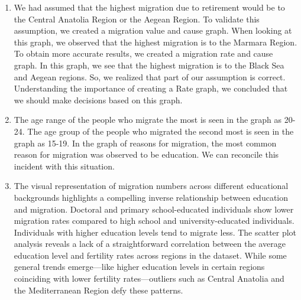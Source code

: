 \documentclass[
  11pt,
  a4paper,
  DIV=11,
  numbers=noendperiod]{scrartcl}
\providecommand{\tightlist}{%
  \setlength{\itemsep}{0pt}\setlength{\parskip}{0pt}}\usepackage{longtable,booktabs,array}
\begin{document}
\begin{enumerate}
\def\labelenumi{\arabic{enumi}.}
\tightlist
\item
  We had assumed that the highest migration due to retirement would be
  to the Central Anatolia Region or the Aegean Region. To validate this
  assumption, we created a migration value and cause graph. When looking
  at this graph, we observed that the highest migration is to the
  Marmara Region. To obtain more accurate results, we created a
  migration rate and cause graph. In this graph, we see that the highest
  migration is to the Black Sea and Aegean regions. So, we realized that
  part of our assumption is correct. Understanding the importance of
  creating a Rate graph, we concluded that we should make decisions
  based on this graph.
\item
  The age range of the people who migrate the most is seen in the graph
  as 20-24. The age group of the people who migrated the second most is
  seen in the graph as 15-19. In the graph of reasons for migration, the
  most common reason for migration was observed to be education. We can
  reconcile this incident with this situation.
\item
  The visual representation of migration numbers across different
  educational backgrounds highlights a compelling inverse relationship
  between education and migration. Doctoral and primary school-educated
  individuals show lower migration rates compared to high school and
  university-educated individuals. Individuals with higher education
  levels tend to migrate less. The scatter plot analysis reveals a lack
  of a straightforward correlation between the average education level
  and fertility rates across regions in the dataset. While some general
  trends emerge---like higher education levels in certain regions
  coinciding with lower fertility rates---outliers such as Central
  Anatolia and the Mediterranean Region defy these patterns.
\end{enumerate}
\end{document}
